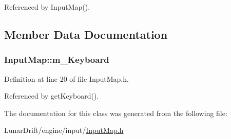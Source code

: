 Referenced by Input\+Map().



\subsection{Member Data Documentation}
\subsubsection[{\texorpdfstring{m\+\_\+\+Keyboard}{m_Keyboard}}]{ Input\+Map\+::m\+\_\+\+Keyboard\hspace{0.3cm}{\ttfamily [private]}}\hypertarget{class_input_map_ae1f1c18ccacc60010acc66c2b8d5fe53}{}\label{class_input_map_ae1f1c18ccacc60010acc66c2b8d5fe53}


Definition at line 20 of file Input\+Map.\+h.



Referenced by get\+Keyboard().



The documentation for this class was generated from the following file\+:\begin{DoxyCompactItemize}
\item 
Lunar\+Drift/engine/input/\hyperlink{_input_map_8h}{Input\+Map.\+h}\end{DoxyCompactItemize}
